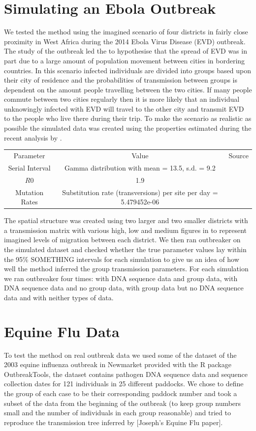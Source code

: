 \documentclass[11pt,a4paper]{report}
\begin{document}
\section{Simulating an Ebola Outbreak}
We tested the method using the imagined scenario of four districts in fairly close proximity in West Africa during the 2014 Ebola Virus Disease (EVD) outbreak. The study of the outbreak led the \citet{Ebola14} to hypothesise that the spread of EVD was in part due to a large amount of population movement between cities in bordering countries. In this scenario infected individuals are divided into groups based upon their city of residence and the probabilities of transmission between groups is dependent on the amount people travelling between the two cities. If many people commute between two cities regularly then it is more likely that an individual unknowingly infected with EVD will travel to the other city and transmit EVD to the people who live there during their trip. To make the scenario as realistic as possible the simulated data was created using the properties estimated during the recent analysis by \citet{Ebola14}.

\begin{tabular}{| c | c | c |}
Parameter & Value & Source \\
Serial Interval & Gamma distribution with mean = 13.5, s.d. = 9.2 & \citet{Ebola14} \\
$R0$ & 1.9 & \citet{Ebola14} \\
Mutation Rates & Substitution rate (transversions) per site per day =  5.479452e-06 & \citet{Gire14} \\

\end{tabular}

The spatial structure was created using two larger and two smaller districts with a transmission matrix with various high, low and medium figures in to represent imagined levels of migration between each district. We then ran outbreaker on the simulated dataset and checked whether the true parameter values lay within the 95\% SOMETHING intervals for each simulation to give us an idea of how well the method inferred the group transmission parameters. For each simulation we ran outbreaker four times: with DNA sequence data and group data, with DNA sequence data and no group data, with group data but no DNA sequence data and with neither types of data. 

\section{Equine Flu Data}
To test the method on real outbreak data we used some of the dataset of the 2003 equine influenza outbreak in Newmarket provided with the R package OutbreakTools, the dataset contains pathogen DNA sequence data and sequence collection dates for 121 individuals in 25 different paddocks. We chose to define the group of each case to be their corresponding paddock number and took a subset of the data from the beginning of the outbreak (to keep group numbers small and the number of individuals in each group reasonable) and tried to reproduce the transmission tree inferred by [Joseph’s Equine Flu paper].
\end{document}
